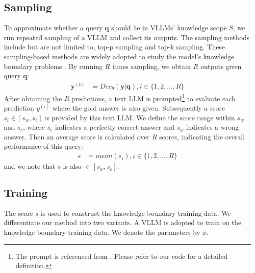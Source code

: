 \subsection{Sampling}
\label{sampling_section}

To approximate whether a query $\bm{q}$ should lie in VLLMs' knowledge scope $S$, we run repeated sampling of a VLLM and collect its outputs. The sampling methods include but are not limited to, top-p sampling and top-k sampling. These sampling-based methods are widely adopted to study the model's knowledge boundary problems \cite{li2025refine, zhang2024exploring, cheng2024can}. By running $R$ times sampling, we obtain $R$ outputs given query $\bm{q}$:
\begin{align}\label{sampling}
\bm{y^{(i)}} &= Dec_\theta(\bm{y}|\bm{q}), i \in \{1, 2, ..., R\}
\end{align}
After obtaining the $R$ predictions, a text LLM is prompted\footnote{The prompt is referenced from \citet{Liu_LlamaIndex_2022}. Please refer to our code for a detailed definition.} to evaluate each prediction $y^{(i)}$ where the gold answer is also given. Subsequently a score $s_i \in [s_w, s_c]$ is provided by this text LLM. We define the score range within $s_w$ and $s_c$, where $s_c$ indicates a perfectly correct answer and $s_w$ indicates a wrong answer. Then an average score is calculated over $R$ scores, indicating the overall performance of this query:
\begin{align}\label{score}
s &= mean(s_i), i \in \{1, 2, ..., R\}
\end{align}
and we note that $s$ is also $\in [s_w, s_c]$. 

\subsection{Training}
\label{training_section}

The score $s$ is used to construct the knowledge boundary training data. We differentiate our method into two variants. 
A VLLM is adopted to train on the knowledge boundary training data. We denote the parameters by $\phi$.


